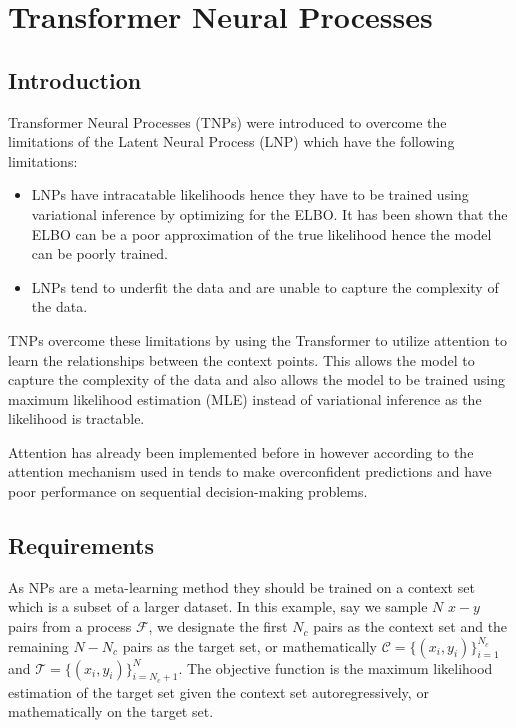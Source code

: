 \documentclass[../../main.tex]{subfiles}
\begin{document}
\section{Transformer Neural Processes}

\subsection{Introduction}

Transformer Neural Processes (TNPs) \cite{nguyen2023transformer} were introduced to overcome the limitations of the Latent Neural Process (LNP) \cite{garnelo2018neural} which have the following limitations:

\begin{itemize}
	\item LNPs have intracatable likelihoods hence they have to be trained using variational inference by optimizing for the ELBO. It has been shown that the ELBO can be a poor approximation of the true likelihood hence the model can be poorly trained.
	\item LNPs tend to underfit the data and are unable to capture the complexity of the data.
\end{itemize}

TNPs overcome these limitations by using the Transformer \cite{vaswani2017attention} to utilize attention to learn the relationships between the context points. This allows the model to capture the complexity of the data and also allows the model to be trained using maximum likelihood estimation (MLE) instead of variational inference as the likelihood is tractable.

Attention has already been implemented before \cite{nguyen2023transformer} in \cite{kim2019attentive} however according to \cite{nguyen2023transformer} the attention mechanism used in \cite{kim2019attentive} tends to make overconfident predictions and have poor performance on sequential decision-making problems.

\subsection{Requirements}

As NPs are a meta-learning method they should be trained on a context set which is a subset of a larger dataset. In this example, say we sample $N$ $x-y$ pairs from a process $\mathcal{F}$, we designate the first $N_c$ pairs as the context set and the remaining $N-N_c$ pairs as the target set, or mathematically $\mathcal{C} = \{(x_i, y_i)\}_{i=1}^{N_c}$ and $\mathcal{T} = \{(x_i, y_i)\}_{i=N_c+1}^{N}$. The objective function is the maximum likelihood estimation of the target set given the context set autoregressively, or mathematically on the target set.
\end{document}
